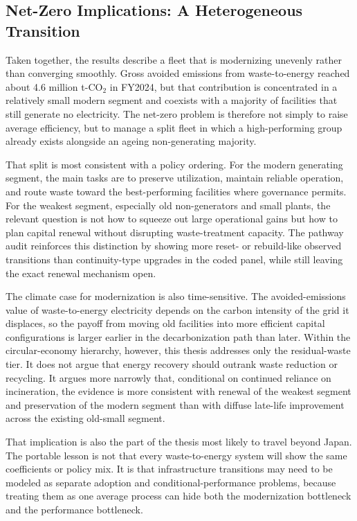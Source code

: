 \documentclass[12pt,a4paper]{article}
\begin{document}
\subsection{Net-Zero Implications: A Heterogeneous Transition}

Taken together, the results describe a fleet that is modernizing unevenly rather than converging smoothly. Gross avoided emissions from waste-to-energy reached about 4.6 million t-CO$_2$ in FY2024, but that contribution is concentrated in a relatively small modern segment and coexists with a majority of facilities that still generate no electricity. The net-zero problem is therefore not simply to raise average efficiency, but to manage a split fleet in which a high-performing group already exists alongside an ageing non-generating majority.

That split is most consistent with a policy ordering. For the modern generating segment, the main tasks are to preserve utilization, maintain reliable operation, and route waste toward the best-performing facilities where governance permits. For the weakest segment, especially old non-generators and small plants, the relevant question is not how to squeeze out large operational gains but how to plan capital renewal without disrupting waste-treatment capacity. The pathway audit reinforces this distinction by showing more reset- or rebuild-like observed transitions than continuity-type upgrades in the coded panel, while still leaving the exact renewal mechanism open.

The climate case for modernization is also time-sensitive. The avoided-emissions value of waste-to-energy electricity depends on the carbon intensity of the grid it displaces, so the payoff from moving old facilities into more efficient capital configurations is larger earlier in the decarbonization path than later. Within the circular-economy hierarchy, however, this thesis addresses only the residual-waste tier. It does not argue that energy recovery should outrank waste reduction or recycling. It argues more narrowly that, conditional on continued reliance on incineration, the evidence is more consistent with renewal of the weakest segment and preservation of the modern segment than with diffuse late-life improvement across the existing old-small segment.

That implication is also the part of the thesis most likely to travel beyond Japan. The portable lesson is not that every waste-to-energy system will show the same coefficients or policy mix. It is that infrastructure transitions may need to be modeled as separate adoption and conditional-performance problems, because treating them as one average process can hide both the modernization bottleneck and the performance bottleneck.
\end{document}

